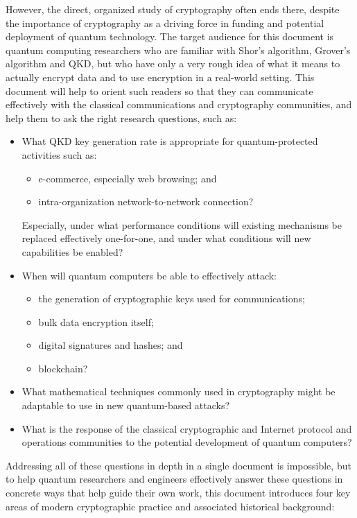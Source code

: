 However, the direct, organized study of cryptography often ends there,
despite the importance of cryptography as a driving force in funding
and potential deployment of quantum technology.  The target audience
for this document is quantum computing researchers who are familiar
with Shor's algorithm, Grover's algorithm and QKD, but who have only a
very rough idea of what it means to actually encrypt data and to use
encryption in a real-world setting.  This document will help to orient
such readers so that they can communicate effectively with the
classical communications and cryptography communities, and help them
to ask the right research questions, such as:

\begin{itemize}
\item What QKD key generation rate is appropriate for
  quantum-protected activities such as:
  \begin{itemize}
  \item e-commerce, especially web browsing; and
  \item intra-organization network-to-network connection?
  \end{itemize}
  Especially, under what performance conditions will existing mechanisms
  be replaced effectively one-for-one, and under what conditions will new
  capabilities be enabled?
\item When will quantum computers be able to effectively attack:
  \begin{itemize}
  \item the generation of cryptographic keys used for communications;
  \item bulk data encryption itself;
  \item digital signatures and hashes; and
  \item blockchain?
  \end{itemize}
\item What mathematical techniques commonly used in cryptography might
  be adaptable to use in new quantum-based attacks?
\item What is the response of the classical cryptographic and Internet
  protocol and operations communities to the potential development of
  quantum computers?
\end{itemize}

Addressing all of these questions in depth in a single document is
impossible, but to help quantum researchers and engineers effectively
answer these questions in concrete ways that help guide their own
work, this document introduces four key areas of modern cryptographic
practice and associated historical background:

